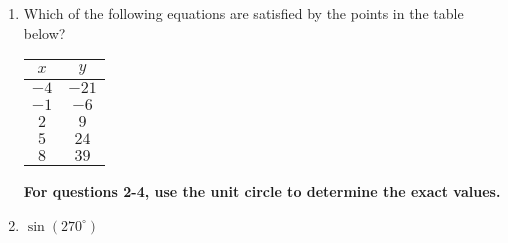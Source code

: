 \documentclass{article}
\begin{document}
\begin{enumerate}


\item Which of the following equations are satisfied by the points in the table below?

    \begin{center}
    \begin{tabular}{ |c|c| } 
        \hline
        $x$ & $y$ \\
        \hline
        $-4$ & $-21$ \\ 
        $-1$ & $-6$ \\ 
        $2$ & $9$ \\
        $5$ & $24$ \\
        $8$ & $39$ \\
        \hline
    \end{tabular}
    \end{center}
\vspace{5pt}

  \begin{enumerate}
  \end{enumerate}

\vspace{5pt}
\hspace{-15pt}\textbf{For questions 2-4, use the unit circle to determine the exact values.}


\item $\sin\left(270^{\circ}\right)$

        \begin{enumerate}
        \end{enumerate}


\end{enumerate}
\end{document}
